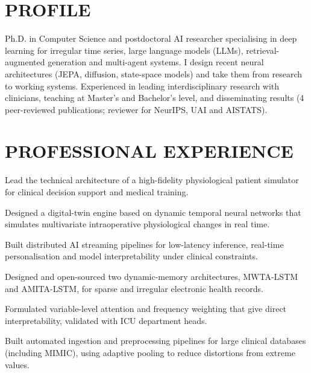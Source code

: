 \section{PROFILE}
{\small Ph.D. in Computer Science and postdoctoral AI researcher specialising in deep learning for irregular time series, large language models (LLMs), retrieval-augmented generation and multi-agent systems. I design recent neural architectures (JEPA, diffusion, state-space models) and take them from research to working systems. Experienced in leading interdisciplinary research with clinicians, teaching at Master’s and Bachelor’s level, and disseminating results (4 peer-reviewed publications; reviewer for NeurIPS, UAI and AISTATS).}

\section{PROFESSIONAL EXPERIENCE}
\begin{cvitems}
  \item Lead the technical architecture of a high-fidelity physiological patient simulator for clinical decision support and medical training.
  \item Designed a digital-twin engine based on dynamic temporal neural networks that simulates multivariate intraoperative physiological changes in real time.
  \item Built distributed AI streaming pipelines for low-latency inference, real-time personalisation and model interpretability under clinical constraints.
\end{cvitems}

\begin{cvitems}
  \item Designed and open-sourced two dynamic-memory architectures, MWTA-LSTM and AMITA-LSTM, for sparse and irregular electronic health records.
  \item Formulated variable-level attention and frequency weighting that give direct interpretability, validated with ICU department heads.
  \item Built automated ingestion and preprocessing pipelines for large clinical databases (including MIMIC), using adaptive pooling to reduce distortions from extreme values.
\end{cvitems}

